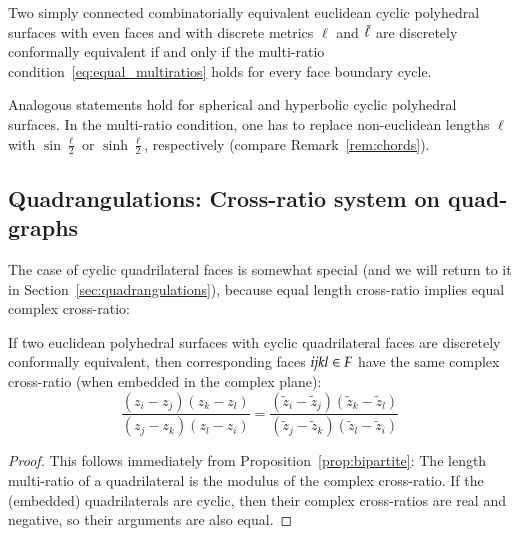 \documentclass[Thesis]{subfiles}
\begin{document}
\begin{corollary}
  \label{cor:simply_connected_bipartite}
  Two simply connected combinatorially equivalent euclidean cyclic
  polyhedral surfaces with even faces and with discrete metrics $\ell$
  and $\tilde{\ell}$ are discretely conformally equivalent if and only
  if the multi-ratio condition~\eqref{eq:equal_multiratios} holds for
  every face boundary cycle.
\end{corollary}

\begin{remark}
  Analogous statements hold for spherical and hyperbolic cyclic
  polyhedral surfaces. In the multi-ratio condition, one has to replace
  non-euclidean lengths $\ell$ with $\sin\frac{\ell}{2}$ or
  $\sinh\frac{\ell}{2}$, respectively (compare
  Remark~\ref{rem:chords}).
\end{remark}

\subsection{Quadrangulations: Cross-ratio system on quad-graphs}
\label{sec:quads}

The case of cyclic quadrilateral faces is somewhat special (and we
will return to it in Section~\ref{sec:quadrangulations}), because
equal length cross-ratio implies equal complex cross-ratio:

\begin{proposition}
  \label{prop:quad}
  If two euclidean polyhedral surfaces with cyclic quadrilateral faces
  are discretely conformally equivalent, then corresponding faces ${\it
  ijkl}\in F$ have the same complex cross-ratio (when embedded in the
  complex plane):
  \begin{equation*}
    \frac{(z_{i}-z_{j})(z_{k}-z_{l})}{(z_{j}-z_{k})(z_{l}-z_{i})}=
    \frac{(\tilde z_{i}-\tilde z_{j})(\tilde z_{k}-\tilde z_{l})}{(\tilde z_{j}-\tilde z_{k})(\tilde z_{l}- \tilde z_{i})}
  \end{equation*}
\end{proposition}

\begin{proof}
  This follows immediately from Proposition~\ref{prop:bipartite}: The
  length multi-ratio of a quadrilateral is the modulus of the complex
  cross-ratio. If the (embedded) quadrilaterals are cyclic, then their
  complex cross-ratios are real and negative, so their arguments are
  also equal.
\end{proof}
\end{document}
